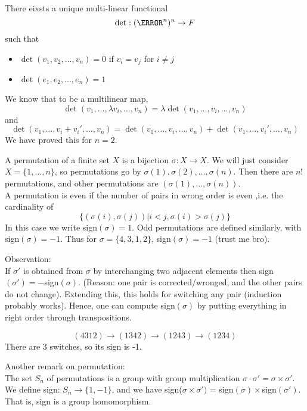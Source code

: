 \documentclass[12pt]{article}
\begin{document}
\begin{thm} \label{theorem}
	There eixsts a unique multi-linear functional
	$$\det: (\F^n)^n \rightarrow F$$
	such that
	\begin{itemize}
		\item $\det(v_1, v_2, \dots, v_n) = 0$ if $v_i = v_j$ for $i \neq j$
		\item $\det(e_1, e_2, \dots, e_n) = 1$
	\end{itemize}

	We know that to be a multilinear map,
	$$\det(v_1, \dots, \lambda v_i, \dots, v_n) = \lambda\det(v_1, \dots, v_i, \dots, v_n)$$
	and
	$$\det(v_1, \dots, v_i + v_i', \dots, v_n) = \det(v_1, \dots, v_i, \dots, v_n) + \det(v_1, \dots, v_i', \dots, v_n)$$
	We have proved this for $n=2$.
\end{thm}

\begin{defn}
	A permutation of a finite set $X$ is a bijection $\sigma: X \rightarrow X$. We will just consider $X = \{1, \dots, n\}$, so permutations go by $\sigma(1), \sigma(2), \dots, \sigma(n)$. Then there are $n!$ permutations, and other permutations are $(\sigma(1), \dots, \sigma(n))$. \\
	A permutation is even if the number of pairs in wrong order is even ,i.e. the cardinality of
	$$\{(\sigma(i), \sigma(j))| i < j, \sigma(i) > \sigma(j)\}$$
	In this case we write sign$(\sigma) = 1$. Odd permutations are defined similarly, with sign$(\sigma) = -1$. Thus for $\sigma = \{4,3,1,2\}$, sign$(\sigma) = -1$ (trust me bro).
\end{defn}

Observation: \\
If $\sigma'$ is obtained from $\sigma$ by interchanging two adjacent elements then sign$(\sigma') = -$sign$(\sigma)$. (Reason: one pair is corrected/wronged, and the other pairs do not change). Extending this, this holds for switching any pair (induction probably works). Hence, one can compute sign$(\sigma)$ by putting everything in right order through transpositions.

\begin{ex}
	$$(4312) \rightarrow (1342) \rightarrow (1243) \rightarrow (1234)$$
	There are 3 switches, so its sign is -1.
\end{ex}

Another remark on permutation: \\
The set $S_n$ of permutations is a group with group multiplication $\sigma \cdot \sigma' = \sigma \times \sigma'$. We define sign: $S_n \rightarrow \{1, -1\}$, and we have sign($\sigma \times \sigma')$ = sign$(\sigma) \times $sign$(\sigma')$. That is, sign is a group homomorphism.
\end{document}
